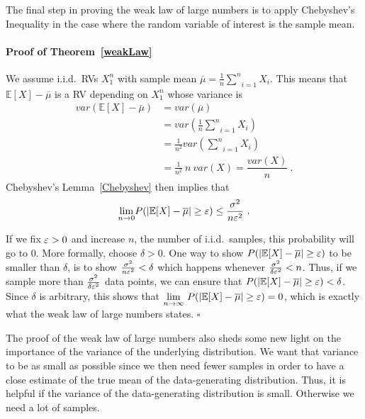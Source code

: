 The final step in proving the weak law of large numbers is to apply Chebyshev's Inequality in the case where the random variable of interest is
the sample mean.

\paragraph{Proof of Theorem~\ref{weakLaw}} We assume i.i.d.\ RVs $ X_{1}^{n} $ with sample mean $ \overline{\mu} = \frac{1}{n} \underset{i=1}{\overset{n}{\sum}} X_{i} $. 
This means that $ \mathbb{E}[X] - \overline{\mu} $  is a RV depending on $ X_{1}^{n} $ whose variance is
\begin{align}
var(\mathbb{E}[X] - \overline{\mu}) &= var(\overline{\mu}) \\ 
&= var\left(\frac{1}{n} \underset{i=1}{\overset{n}{\sum}} X_{i} \right) \\
&= \frac{1}{n^{2}}var\left(\underset{i=1}{\overset{n}{\sum}} X_i\right) \\
&= \frac{1}{n^{2}}~n~var(X) = \dfrac{var(X)}{n} \ .
\end{align}
Chebyshev's Lemma~\ref{Chebyshev} then implies that 
\begin{equation}
\underset{n \rightarrow 0}{\lim}P(|\mathbb{E}[X] - \overline{\mu}| \geq \eps) \leq \frac{\sigma^{2}}{n\eps^{2}} \ .
\end{equation}

If we fix $ \varepsilon > 0 $ and increase $n$, the number of i.i.d.\ samples, this probability will go to 0.
More formally, choose $ \delta > 0 $. One way to show $ P(|\mathbb{E}[X] - \overline{\mu}| \geq \varepsilon) $ to be smaller than $ \delta $, is to show 
$ \frac{\sigma^{2}}{n\varepsilon^{2}} < \delta $ which happens whenever $ \frac{\sigma^{2}}{\delta\varepsilon^{2}} < n $. Thus, if we sample
more than $ \frac{\sigma^{2}}{\delta\varepsilon^{2}} $ data points, we can ensure that $ P(|\mathbb{E}[X] - \overline{\mu}| \geq \varepsilon) < \delta $.
Since $ \delta $ is arbitrary, this shows that $ \underset{n \rightarrow \infty}{\lim}~P(|\mathbb{E}[X] - \overline{\mu}| \geq \varepsilon) = 0 $, 
which is exactly what the weak law of large numbers states. $ \square $ \bigskip

The proof of the weak law of large numbers also sheds some new light on the importance of the variance of the underlying distribution. 
We want that variance to be as small as possible
since we then need fewer samples in order to have a close estimate of the true mean of the data-generating distribution. 
Thus, it is helpful if the variance of the 
data-generating distribution is small. Otherwise we need a lot of samples.

